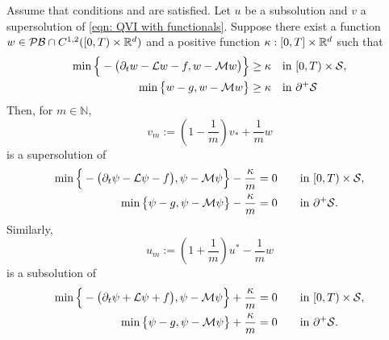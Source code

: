 \begin{lemma}%
\label{lemma: Lemma 5.10 in Seydel}
    Assume that conditions  and  are satisfied. Let $u$ be a subsolution and $v$ a supersolution of \eqref{eqn: QVI with functionals}. Suppose there exist a function $w \in \mathcal{PB} \cap C^{1,2}([0,T)\times \mathbb{R}^d)$ and a positive function $\kappa: [0,T] \times \mathbb{R}^d$ such that
    \begin{align*}
        \min \Big \{ - \big(\partial_t w - \mathcal{L} w - f, w - \mathcal{M} w \big) \Big\} \geq \kappa & \quad \text{in } [0,T) \times \mathcal{S}, \\
        \min \big\{ w - g, w - \mathcal{M} w \big\} \geq \kappa & \quad \text{in } \partial^+ \mathcal{S}
    \end{align*}
    Then, for $m \in \mathbb N$, 
    \begin{equation*}
        v_m := \left( 1 - \frac{1}{m} \right) v_* + \frac{1}{m} w
    \end{equation*}
    is a supersolution of 
    \begin{equation}
        \begin{aligned}
            \min \Big\{ -\big(\partial_t \psi - \mathcal{L} \psi - f \big), \psi - \mathcal{M} \psi \Big\} - \frac{\kappa}{m} &= 0 && \quad \text{in } [0,T) \times \mathcal{S},\\
            \min \big\{ \psi - g, \psi - \mathcal{M} \psi \big\} - \frac{\kappa}{m} &= 0 && \quad \text{in } \partial^+ \mathcal{S}.
        \end{aligned}
        \label{eqn: (43) in Seydel}
    \end{equation}
    Similarly, 
    \begin{equation*}
        u_m := \left( 1 + \frac{1}{m} \right) u^* - \frac{1}{m} w
    \end{equation*}
    is a subsolution of 
    \begin{equation}
        \begin{aligned}
            \min \Big\{ -\big(\partial_t \psi + \mathcal{L} \psi + f \big), \psi - \mathcal{M} \psi \Big\} + \frac{\kappa}{m} &= 0 && \quad \text{in } [0,T) \times \mathcal{S}, \\
            \min \big\{ \psi - g, \psi - \mathcal{M} \psi \big\} + \frac{\kappa}{m} &= 0 && \quad \text{in } \partial^+ \mathcal{S}.
        \end{aligned}
        \label{eqn: (43*) in Seydel}
    \end{equation}
\end{lemma}

